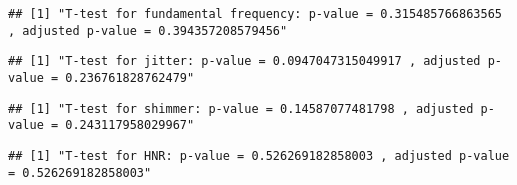 \documentclass[
]{article}
\newenvironment{Shaded}{\begin{snugshade}}{\end{snugshade}}
\newcommand{\DecValTok}[1]{\textcolor[rgb]{0.00,0.00,0.81}{#1}}
\newcommand{\FunctionTok}[1]{\textcolor[rgb]{0.00,0.00,0.00}{#1}}
\newcommand{\NormalTok}[1]{#1}
\newcommand{\SpecialCharTok}[1]{\textcolor[rgb]{0.00,0.00,0.00}{#1}}
\newcommand{\StringTok}[1]{\textcolor[rgb]{0.31,0.60,0.02}{#1}}
\begin{document}
\begin{verbatim}
## [1] "T-test for fundamental frequency: p-value = 0.315485766863565 , adjusted p-value = 0.394357208579456"
\end{verbatim}

\begin{Shaded}
\end{Shaded}

\begin{verbatim}
## [1] "T-test for jitter: p-value = 0.0947047315049917 , adjusted p-value = 0.236761828762479"
\end{verbatim}

\begin{Shaded}
\end{Shaded}

\begin{verbatim}
## [1] "T-test for shimmer: p-value = 0.14587077481798 , adjusted p-value = 0.243117958029967"
\end{verbatim}

\begin{Shaded}
\end{Shaded}

\begin{verbatim}
## [1] "T-test for HNR: p-value = 0.526269182858003 , adjusted p-value = 0.526269182858003"
\end{verbatim}
\end{document}
